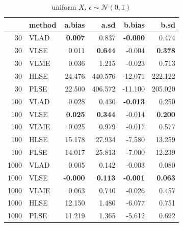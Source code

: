 \documentclass[twoside]{article}
\begin{document}
\begin{table}[ht]
\centering
\caption{uniform $X$, $\epsilon \sim \mathcal{N}(0,1)$}
\begin{tabular}{rlrrrr}
  \hline
 & method & a.bias & a.sd & b.bias & b.sd \\ 
  \hline
  30 & VLAD & \textbf{0.007} & 0.837 & \textbf{-0.000} & 0.474 \\ 
  30 & VLSE & 0.011 & \textbf{0.644} & -0.004 & \textbf{0.378} \\ 
  30 & VLME & 0.036 & 1.215 & -0.023 & 0.713 \\ 
  30 & HLSE & 24.476 & 440.576 & -12.071 & 222.122 \\ 
  30 & PLSE & 22.500 & 406.572 & -11.100 & 205.020 \\ 
   \hline
  100 & VLAD & 0.028 & 0.430 & \textbf{-0.013} & 0.250 \\ 
  100 & VLSE & \textbf{0.025} & \textbf{0.344} & -0.014 & \textbf{0.200} \\ 
  100 & VLME & 0.025 & 0.979 & -0.017 & 0.577 \\ 
  100 & HLSE & 15.178 & 27.934 & -7.580 & 13.259 \\ 
  100 & PLSE & 14.017 & 25.813 & -7.000 & 12.239 \\ 
   \hline
  1000 & VLAD & 0.005 & 0.142 & -0.003 & 0.080 \\ 
  1000 & VLSE & \textbf{-0.000} & \textbf{0.113} & \textbf{-0.001} & \textbf{0.063} \\ 
  1000 & VLME & 0.063 & 0.740 & -0.026 & 0.457 \\ 
  1000 & HLSE & 12.150 & 1.480 & -6.077 & 0.751 \\ 
  1000 & PLSE & 11.219 & 1.365 & -5.612 & 0.692 \\ 
   \hline
\end{tabular}
\end{table}
\end{document}
